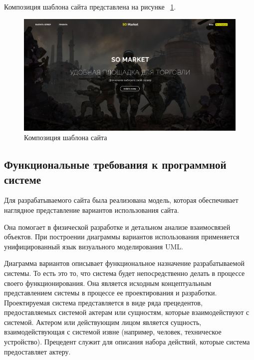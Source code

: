 Композиция шаблона сайта представлена на рисунке ~\ref{fig:image}.
\begin{figure}[ht]
	\centering
	\includegraphics[width=1\linewidth]{images/image}
	\caption{Композиция шаблона сайта}
	\label{fig:image}
\end{figure}

\subsection{Функциональные требования к программной системе}

Для разрабатываемого сайта была реализована модель, которая обеспечивает наглядное представление вариантов использования сайта.

Она помогает в физической разработке и детальном анализе взаимосвязей объектов. При построении диаграммы вариантов использования применяется унифицированный язык визуального моделирования UML.

Диаграмма вариантов описывает функциональное назначение разрабатываемой системы. То есть это то, что система будет непосредственно делать в процессе своего функционирования. Она является исходным концептуальным представлением системы в процессе ее проектирования и разработки. Проектируемая система представляется в виде ряда прецедентов, предоставляемых системой актерам или сущностям, которые взаимодействуют с системой. Актером или действующим лицом является сущность, взаимодействующая с системой извне (например, человек, техническое устройство). Прецедент служит для описания набора действий, которые система предоставляет актеру.

